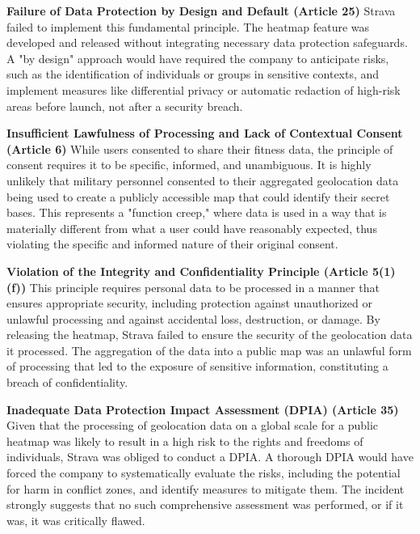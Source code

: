 \documentclass{article}
\begin{document}
\textbf{Failure of Data Protection by Design and Default (Article 25)} Strava failed to implement this fundamental principle. The heatmap feature was developed and released without integrating necessary data protection safeguards. A "by design" approach would have required the company to anticipate risks, such as the identification of individuals or groups in sensitive contexts, and implement measures like differential privacy or automatic redaction of high-risk areas before launch, not after a security breach.

\textbf{Insufficient Lawfulness of Processing and Lack of Contextual Consent (Article 6)} While users consented to share their fitness data, the principle of consent requires it to be specific, informed, and unambiguous. It is highly unlikely that military personnel consented to their aggregated geolocation data being used to create a publicly accessible map that could identify their secret bases. This represents a "function creep," where data is used in a way that is materially different from what a user could have reasonably expected, thus violating the specific and informed nature of their original consent.

\textbf{Violation of the Integrity and Confidentiality Principle (Article 5(1)(f))} This principle requires personal data to be processed in a manner that ensures appropriate security, including protection against unauthorized or unlawful processing and against accidental loss, destruction, or damage. By releasing the heatmap, Strava failed to ensure the security of the geolocation data it processed. The aggregation of the data into a public map was an unlawful form of processing that led to the exposure of sensitive information, constituting a breach of confidentiality.

\textbf{Inadequate Data Protection Impact Assessment (DPIA) (Article 35)} Given that the processing of geolocation data on a global scale for a public heatmap was likely to result in a high risk to the rights and freedoms of individuals, Strava was obliged to conduct a DPIA. A thorough DPIA would have forced the company to systematically evaluate the risks, including the potential for harm in conflict zones, and identify measures to mitigate them. The incident strongly suggests that no such comprehensive assessment was performed, or if it was, it was critically flawed.
\end{document}
